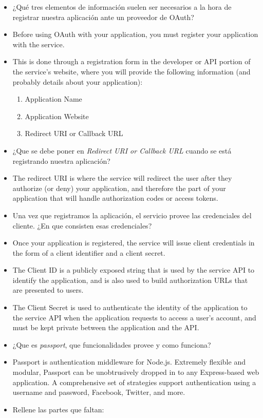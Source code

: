 \begin{itemize}
\itemsep1pt\parskip0pt
\item
  ¿Qué tres elementos de información suelen ser necesarios a la hora de
  registrar nuestra aplicación ante un proveedor de OAuth?
\item
  Before using OAuth with your application, you must register your
  application with the service.
\item
  This is done through a registration form in the developer or API
  portion of the service's website, where you will provide the following
  information (and probably details about your application):

  \begin{enumerate}
  \def\labelenumi{\arabic{enumi}.}
  \itemsep1pt\parskip0pt
  \item
    Application Name
  \item
    Application Website
  \item
    Redirect URI or Callback URL
  \end{enumerate}
\item
  ¿Que se debe poner en \emph{Redirect URI or Callback URL} cuando se
  está registrando nuestra aplicación?
\item
  The redirect URI is where the service will redirect the user after
  they authorize (or deny) your application, and therefore the part of
  your application that will handle authorization codes or access
  tokens.
\item
  Una vez que registramos la aplicación, el servicio provee las
  credenciales del cliente. ¿En que consisten esas credenciales?
\item
  Once your application is registered, the service will issue client
  credentials in the form of a client identifier and a client secret.
\item
  The Client ID is a publicly exposed string that is used by the service
  API to identify the application, and is also used to build
  authorization URLs that are presented to users.
\item
  The Client Secret is used to authenticate the identity of the
  application to the service API when the application requests to access
  a user's account, and must be kept private between the application and
  the API.
\item
  ¿Que es \emph{passport}, que funcionalidades provee y como funciona?
\item
  Passport is authentication middleware for Node.js. Extremely flexible
  and modular, Passport can be unobtrusively dropped in to any
  Express-based web application. A comprehensive set of strategies
  support authentication using a username and password, Facebook,
  Twitter, and more.
\item
  Rellene las partes que faltan:
\end{itemize}

